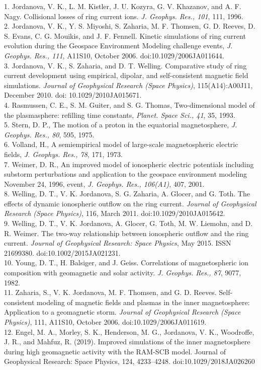 
1. Jordanova, V. K., L. M. Kistler, J. U. Kozyra, G. V. Khazanov, and A. F. Nagy. Collisional losses of ring current ions. {\it J. Geophys. Res., 101}, 111, 1996.
\\
2. Jordanova, V. K., Y. S. Miyoshi, S. Zaharia, M. F. Thomsen, G. D. Reeves, D. S. Evans, C. G. Mouikis, and J. F. Fennell. Kinetic simulations of ring current evolution during the Geospace Environment Modeling challenge events, {\it J. Geophys. Res., 111}, A11S10, October 2006. doi:10.1029/2006JA011644.
\\
3. Jordanova, V. K., S. Zaharia, and D. T. Welling. Comparative study of ring current development using empirical, dipolar, and self-consistent magnetic field simulations. {\it Journal of Geophysical Research (Space
Physics)}, 115(A14):A00J11, December 2010. doi: 10.1029/2010JA015671. 
\\
4. Rasmussen, C. E., S. M. Guiter, and S. G. Thomas, Two-dimensional model of the plasmasphere: refilling time constants, {\it Planet. Space Sci., 41}, 35, 1993. 
\\
5. Stern, D. P., The motion of a proton in the equatorial magnetosphere, {\it J. Geophys. Res., 80}, 595, 1975.
\\
6. Volland, H., A semiempirical model of large-scale magnetospheric electric fields, {\it J. Geophys. Res., 78}, 171, 1973.
\\
7. Weimer, D. R., An improved model of ionospheric electric potentials including substorm perturbations and application to the geospace environment modeling November 24, 1996, event, {\it J. Geophys. Res., 106(A1)}, 407, 2001.
\\
8. Welling, D. T., V. K. Jordanova, S. G. Zaharia, A. Glocer, and G. Toth. The effects of dynamic ionospheric outflow on the ring current. {\it Journal of Geophysical Research (Space Physics)}, 116, March 2011. doi:10.1029/2010JA015642.
\\
9. Welling, D. T., V. K. Jordanova, A. Glocer, G. Toth, M. W. Liemohn, and D. R. Weimer. The two-way relationship between ionospheric outflow and the ring current. {\it Journal of Geophysical Research:
Space Physics}, May 2015. ISSN 21699380. doi:10.1002/2015JA021231. 
\\
10. Young, D. T., H. Balsiger, and J. Geiss. Correlations of magnetospheric ion composition with geomagnetic and solar activity. {\it J. Geophys. Res., 87}, 9077, 1982.
\\
11. Zaharia, S., V. K. Jordanova, M. F. Thomsen, and G. D. Reeves. Self-consistent modeling of magnetic fields and plasmas in the inner magnetosphere: Application to a geomagnetic storm. {\it Journal of Geophysical Research (Space Physics)}, 111, A11S10, October 2006. doi:10.1029/2006JA011619.
\\
12. Engel, M. A., Morley, S. K., Henderson, M. G., Jordanova, V. K., Woodroffe, J. R., and Mahfuz, R. (2019). Improved simulations of the inner magnetosphere during high geomagnetic activity with the RAM-SCB model. Journal of Geophysical Research: Space Physics, 124, 4233–4248. doi:10.1029/2018JA026260\\

